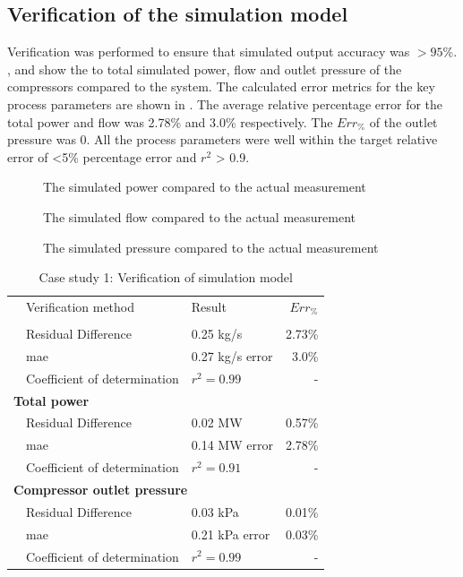 \subsection{Verification of the simulation model}
Verification was performed to ensure that simulated output accuracy was $>95$\%. ,  and  show the to total simulated power, flow and outlet pressure of the compressors compared to the system. The calculated error metrics for the key process parameters are shown in . The average relative percentage error for the total power and flow was 2.78\% and 3.0\% respectively. The $Err_{\%}$ of the outlet pressure was 0. All the process parameters were well within the target relative error of <5\% percentage error and $r^2$ > 0.9. 
\begin{figure}[h!]
	\centering
	
	\caption{The simulated power compared to the actual measurement}
	\label{fig: Verification power Beatrix}
\end{figure}
\begin{figure}[h!]
	\centering
	
	\caption{The simulated flow compared to the actual measurement}
	\label{fig: Verification flow Beatrix}
\end{figure}
\begin{figure}[h!]
	\centering
	
	\caption{The simulated pressure compared to the actual measurement}
	\label{fig: Verification Pressure Beatrix}
\end{figure}
 \begin{table}[h!]
	\centering
	\begin{tabular}{p{0.5cm}p{8cm}p{5cm}r}
		\hline
		&Verification method & Result & $Err_{\%}$\\
		\hhline{====}
		\multicolumn{4}{l}{\textbf{ Total Flow}}\\
		&Residual Difference  & 0.25 kg/s & 2.73\% \\
		&\gls{mae} 					 & 0.27 kg/s error & 3.0\% \\
		&Coefficient of determination & $r^2 =0.99$ & -\\ 
		\multicolumn{4}{l}{\textbf{ Total power}}\\
		&Residual Difference  & 0.02 MW & 0.57\% \\
		&\gls{mae} 					 & 0.14 MW error & 2.78\% \\
		&Coefficient of determination & $r^2 =0.91$ & -\\ 
		\multicolumn{4}{l}{\textbf{ Compressor outlet pressure}}\\
		&Residual Difference  &0.03 kPa & 0.01\% \\
		&\gls{mae} 					 & 0.21 kPa error & 0.03\% \\
		&Coefficient of determination & $r^2 =0.99$ & -\\
		\hline
	\end{tabular} 
	\caption{Case study 1: Verification of simulation model}
	\label{Beet verification table}
\end{table}
